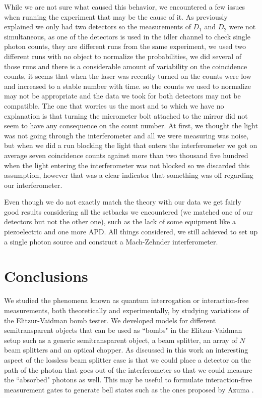 \documentclass[12pt]{book}
\begin{document}
While we are not sure what caused this behavior, we encountered a few issues when running the experiment that may be the cause of it. As previously explained we only had two detectors so the measurements of $D_{1}$ and $D_{2}$ were not simultaneous, as one of the detectors is used in the idler channel to check single photon counts, they are different runs from the same experiment, we used two different runs with no object to normalize the probabilities, we did several of those runs and there is a considerable amount of variability on the coincidence counts, it seems that when the laser was recently turned on the counts were low and increased to a stable number with time. so the counts we used to normalize may not be appropriate and the data we took for both detectors may not be compatible. The one that worries us the most and to which we have no explanation is that turning the micrometer bolt attached to the mirror did not seem to have any consequence on the count number. At first, we thought the light was not going through the interferometer and all we were measuring was noise, but when we did a run blocking the light that enters the interferometer we got on average seven coincidence counts against more than two thousand five hundred when the light entering the interferometer was not blocked so we discarded this assumption, however that was a clear indicator that something was off regarding our interferometer.


Even though we do not exactly match the theory with our data we get fairly good results considering all the setbacks we encountered (we matched one of our detectors but not the other one), such as the lack of some equipment like a piezoelectric and one more APD. All things considered, we still achieved to set up a single photon source and construct a Mach-Zehnder interferometer.



\pagebreak

 
\chapter*{Conclusions}
\thispagestyle{plain}
We studied the phenomena known as quantum interrogation or interaction-free measurements, both theoretically and experimentally, by studying variations of the Elitzur-Vaidman bomb tester. We developed models for different semitransparent objects that can be used as ``bombs" in the Elitzur-Vaidman setup such as a generic semitransparent object, a beam splitter, an array of $N$ beam splitters and an optical chopper. As discussed in this work an interesting aspect of the lossless beam splitter case is that we could place a detector on the path of the photon that goes out of the interferometer so that we could measure the ``absorbed" photons as well. This may be useful to formulate interaction-free measurement gates to generate bell states such as the ones proposed by Azuma \cite{computacion}.
\end{document}
